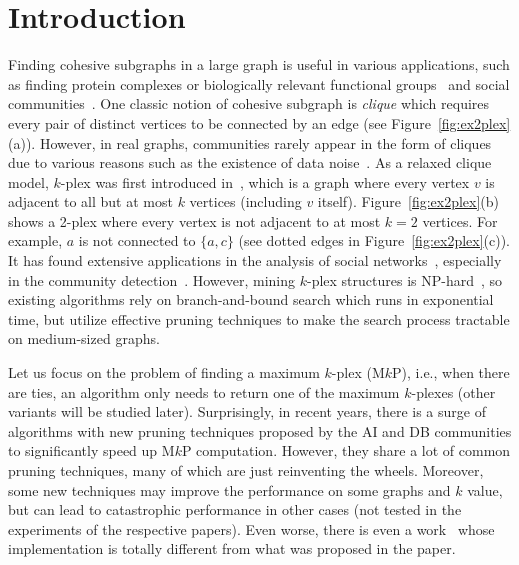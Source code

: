 \documentclass[sigconf, nonacm]{acmart}
\begin{document}
\section{Introduction}\label{sec:intro}
Finding cohesive subgraphs in a large graph is useful in various applications, such as finding protein complexes or biologically relevant functional groups~\cite{bader2003automated,bu2003topological,hu2005mining,ucar2006improving} and social communities~\cite{li2014uncovering,hopcroft2004tracking}. One classic notion of cohesive subgraph is {\em clique} which requires every pair of distinct vertices to be connected by an edge (see Figure~\ref{fig:ex2plex}(a)). However, in real graphs, communities rarely appear in the form of cliques due to various reasons such as the existence of data noise~\cite{pattillo2013clique,www22maximal,d2k,kdd17}. 
%
As a relaxed clique model, $k$-plex was first introduced in~\cite{seidman1978graph}, which is a graph where every vertex $v$ is adjacent to all but at most $k$ vertices (including $v$ itself). Figure~\ref{fig:ex2plex}(b) shows a 2-plex where every vertex is not adjacent to at most $k=2$ vertices. For example, $a$ is not connected to $\{a, c\}$ (see dotted edges in Figure~\ref{fig:ex2plex}(c)). 
%
It has found extensive applications in the analysis of social networks~\cite{seidman1978graph}, especially in the community detection~\cite{pattillo2013clique,d2k}. However, mining $k$-plex structures is NP-hard~\cite{DBLP:journals/jcss/LewisY80,DBLP:journals/ior/BalasundaramBH11}, so existing algorithms rely on branch-and-bound search which runs in exponential time, but utilize effective pruning techniques to make the search process tractable on medium-sized graphs.

Let us focus on the problem of finding a maximum $k$-plex (M$k$P), i.e., when there are ties, an algorithm only needs to return one of the maximum $k$-plexes (other variants will be studied later). Surprisingly, in recent years, there is a surge of algorithms with new pruning techniques proposed by the AI and DB communities to significantly speed up M$k$P computation. However, they share a lot of common pruning techniques, many of which are just reinventing the wheels. Moreover, some new techniques may improve the performance on some graphs and $k$ value, but can lead to catastrophic performance in other cases (not tested in the experiments of the respective papers). Even worse, there is even a work~\cite{Maple} whose implementation is totally different from what was proposed in the paper.
\end{document}
